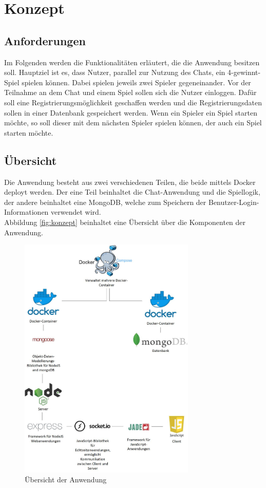 
\chapter{Konzept}\label{cha:Konzept}
\section{Anforderungen}\label{sec:Anforderungen}
Im Folgenden werden die Funktionalitäten erläutert, die die Anwendung besitzen soll. Hauptziel ist es, dass Nutzer, parallel zur Nutzung des Chats, ein 4-gewinnt-Spiel spielen können. Dabei spielen jeweils zwei Spieler gegeneinander. Vor der Teilnahme an dem Chat und einem Spiel sollen sich die Nutzer einloggen. Dafür soll eine Registrierungsmöglichkeit geschaffen werden und die Registrierungsdaten sollen in einer Datenbank gespeichert werden. Wenn ein Spieler ein Spiel starten möchte, so soll dieser mit dem nächsten Spieler spielen können, der auch ein Spiel starten möchte.
\section{Übersicht}\label{sec:Übersicht}
Die Anwendung besteht aus zwei verschiedenen Teilen, die beide mittels Docker deployt werden. 
Der eine Teil beinhaltet die Chat-Anwendung und die Spiellogik, der andere beinhaltet eine MongoDB, welche zum Speichern der Benutzer-Login-Informationen verwendet wird.\\
Abbildung \ref{fig:konzept} beinhaltet eine Übersicht über die Komponenten der Anwendung.

\begin{figure}[H]
\centering
\includegraphics[width=0.75\textwidth]{images/uebersicht.jpg}
\caption{Übersicht der Anwendung}
\label{fig:koncept}
\end{figure}


